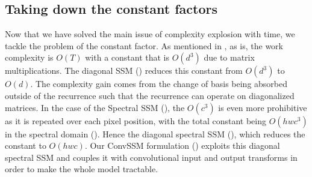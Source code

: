 \documentclass{article}
\begin{document}
\subsection{Taking down the constant factors}
\label{app:constant_factors}
Now that we have solved the main issue of complexity explosion with time, we tackle the problem of the constant factor. As mentioned in , as is, the work complexity is $O(T)$ with a constant that is $O(d^3)$ due to matrix multiplications.
%
The diagonal SSM () reduces this constant from $O(d^3)$ to $O(d)$. The complexity gain comes from the change of basis being absorbed outside of the recurrence such that the recurrence can operate on diagonalized matrices.
In the case of the Spectral SSM (), the $O(c^3)$ is even more prohibitive as it is repeated over each pixel position, with the total constant being $O(hwc^3)$ in the spectral domain (). Hence the diagonal spectral SSM (), which reduces the constant to $O(hwc)$. Our ConvSSM formulation () exploits this diagonal spectral SSM and couples it with convolutional input and output transforms in order to make the whole model tractable.
\end{document}
